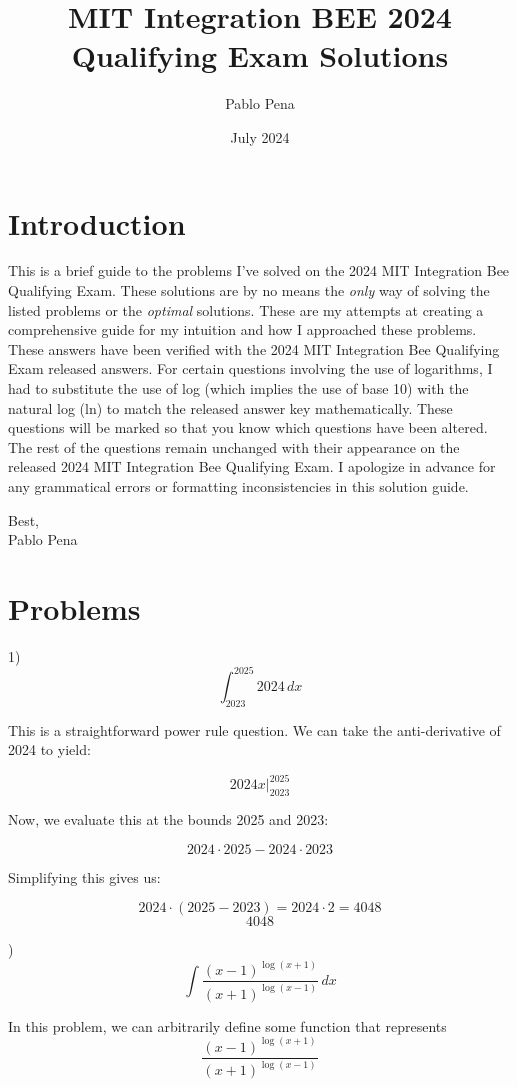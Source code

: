 \documentclass{article}
\title{MIT Integration BEE 2024 Qualifying Exam Solutions}
\author{Pablo Pena}
\date{July 2024}
\begin{document}
\maketitle

\section{Introduction}
This is a brief guide to the problems I've solved on the 2024 MIT Integration Bee Qualifying Exam. These solutions are by no means the \textit{only} way of solving the listed problems or the \textit{optimal} solutions. These are my attempts at creating a comprehensive guide for my intuition and how I approached these problems. These answers have been verified with the 2024 MIT Integration Bee Qualifying Exam released answers. For certain questions involving the use of logarithms, I had to substitute the use of log (which implies the use of base 10) with the natural log (ln) to match the released answer key mathematically. These questions will be marked so that you know which questions have been altered. The rest of the questions remain unchanged with their appearance on the released 2024 MIT Integration Bee Qualifying Exam. I apologize in advance for any grammatical errors or formatting inconsistencies in this solution guide.
\vspace{1em}

\noindent Best, \\
Pablo Pena

\section{Problems}

1)
\[ \int_{2023}^{2025} 2024 \,dx \]

\noindent This is a straightforward power rule question. We can take the anti-derivative of 2024 to yield:

\[2024x \Big|_{2023}^{2025}\]

\noindent Now, we evaluate this at the bounds 2025 and 2023:

\[2024 \cdot 2025 - 2024 \cdot 2023\]

\noindent Simplifying this gives us:

\[2024 \cdot (2025 - 2023) = 2024 \cdot 2 = 4048\]
\[ \boxed{4048} \]

)
\[\int\frac{(x-1)^{\log(x+1)}}{(x+1)^{\log(x-1)}}\,dx\]

\noindent In this problem, we can arbitrarily define some function that represents \[\frac{(x-1)^{ \log(x+1)}}{(x+1)^{ \log(x-1)}}\]
\end{document}
